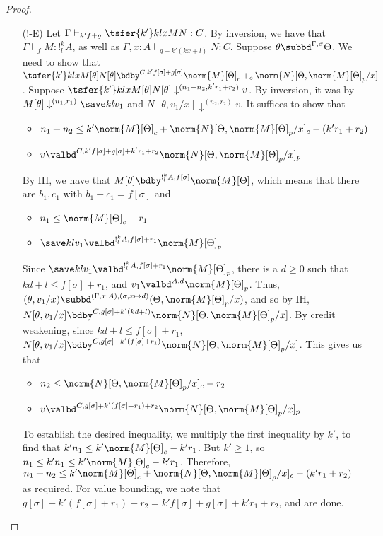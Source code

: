 \begin{proof}
\begin{itemize}
\item[($!$-E)]  Let $\Gamma \vdash_{k'f + g} \tsfer {k'} k l x M N : C$. By inversion, we have that $\Gamma \vdash_f M : !^k_l A$, as well as $\Gamma,x : A\vdash_{g+k'(kx+l)} N : C$. Suppose $\theta \subbd^{\Gamma,\sigma} \Theta$. 
We need to show that $\tsfer {k'} k l x {M[\theta]} {N[\theta]} \bdby^{C,k'f[\sigma] + g[\sigma]} \norm{M}[\Theta]_c +_c \norm{N}[\Theta,\norm{M}[\Theta]_p/x]$. 
Suppose $\tsfer {k'} k l x {M[\theta]} {N[\theta]} \downarrow^{(n_1+n_2,k'r_1+r_2)} v$. By inversion, it was by $M[\theta] \downarrow^{(n_1,r_1)} \save k l {v_1}$ and $N[\theta,v_1/x] \downarrow^{(n_2,r_2)} v$.
It suffices to show that
\begin{itemize}
  \item $n_1 + n_2 \leq k'\norm{M}[\Theta]_c + \norm{N}[\Theta,\norm{M}[\Theta]_p/x]_c - (k'r_1 + r_2)$
  \item $v \valbd^{C,k'f[\sigma] + g[\sigma] + k'r_1 + r_2} \norm{N}[\Theta,\norm{M}[\Theta]_p/x]_p$
\end{itemize}
By IH, we have that $M[\theta] \bdby^{!^k_l A, f[\sigma]} \norm{M}[\Theta]$, which means that there are $b_1,c_1$ with $b_1 + c_1 = f[\sigma]$ and
\begin{itemize}
  \item $n_1 \leq \norm{M}[\Theta]_c - r_1$
  \item $\save k l {v_1} \valbd^{!^k_l A,f[\sigma] + r_1} \norm{M}[\Theta]_p$
\end{itemize}
Since $\save k l {v_1} \valbd^{!^k_l A,f[\sigma] + r_1} \norm{M}[\Theta]_p$, there is a $d \geq 0$ such that $kd+l \leq f[\sigma] + r_1$, and $v_1 \valbd^{A,d} \norm{M}[\Theta]_p$. Thus, $(\theta,v_1/x) \subbd^{(\Gamma,x:A),(\sigma,x\mapsto d)} (\Theta,\norm{M}[\Theta]_p/x)$, and so by IH, $N[\theta,v_1/x] \bdby^{C,g[\sigma] + k'(kd+l)} \norm{N}[\Theta,\norm{M}[\Theta]_p/x]$.
By credit weakening, since $kd+l \leq f[\sigma] + r_1$,  $N[\theta,v_1/x] \bdby^{C,g[\sigma] + k'(f[\sigma] + r_1)} \norm{N}[\Theta,\norm{M}[\Theta]_p/x]$. This gives us that
\begin{itemize}
  \item $n_2 \leq \norm{N}[\Theta,\norm{M}[\Theta]_p/x]_c - r_2$
  \item $v \valbd^{C,g[\sigma] + k'(f[\sigma] + r_1) + r_2} \norm{N}[\Theta,\norm{M}[\Theta]_p/x]_p$
\end{itemize}
To establish the desired inequality, we multiply the first inequality by $k'$, to find that $k'n_1 \leq k'\norm{M}[\Theta]_c - k'r_1$. But $k' \geq 1$,
so $n_1 \leq k'n_1 \leq k'\norm{M}[\Theta]_c - k'r_1$. Therefore, $n_1 + n_2 \leq k'\norm{M}[\Theta]_c + \norm{N}[\Theta,\norm{M}[\Theta]_p/x]_c - (k'r_1 + r_2)$ as required. For value bounding, we note that $g[\sigma] + k'(f[\sigma] + r_1) + r_2 = k'f[\sigma] + g[\sigma] + k'r_1 +r_2$, and are done.


\end{itemize}
\end{proof}
